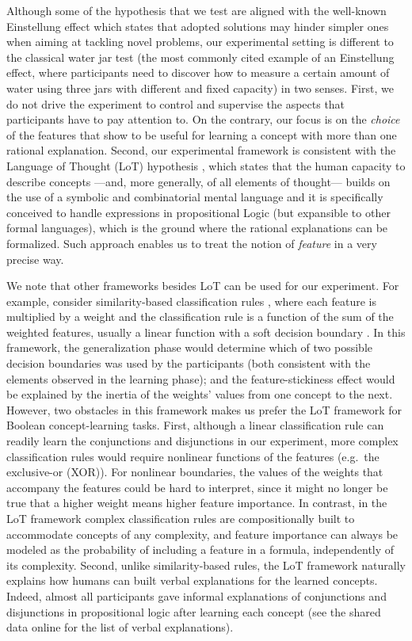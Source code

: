 Although some of the hypothesis that we test are aligned with the well-known Einstellung effect which states that adopted solutions may hinder simpler ones when aiming at tackling novel problems, our experimental setting is different to the classical water jar test (the most commonly cited example of an Einstellung effect, where participants need to discover how to measure a certain amount of water using three jars with different and fixed capacity)  \cite{luchins1942mechanization}
in two senses. First, we do not drive the experiment to control and supervise the aspects that participants have to pay attention to. On the contrary, our focus is on the {\em choice} of the features that show to be useful for learning a concept with more than one rational explanation. Second, our experimental framework is consistent with the Language of Thought (LoT) hypothesis \cite{fodor1975language}, which states that the human capacity to describe concepts —and, more generally, of all elements of thought— builds on the use of a symbolic and combinatorial mental language
and it is specifically conceived to handle expressions in propositional Logic (but expansible to other formal languages), which is the ground where the rational explanations can be formalized. Such approach enables us to treat the notion of {\em feature} in a very precise way. 

We note that other frameworks besides LoT can be used for our experiment. For example, consider similarity-based classification rules \cite{juslin2003cue,juslin2003exemplar}, where each feature is multiplied by a weight and the classification rule is a function of the sum of the weighted features, usually a linear function with a soft decision boundary \cite{juslin2003exemplar}. In this framework, the generalization phase would determine which of two possible decision boundaries was used by the participants (both consistent with the elements observed in the learning phase); and the feature-stickiness effect would be explained by the inertia of the weights' values from one concept to the next. However, two obstacles in this framework makes us prefer the LoT framework for Boolean concept-learning tasks. First, although a linear classification rule can readily learn the conjunctions and disjunctions in our experiment, more complex classification rules would require nonlinear functions of the features (e.g.\ the exclusive-or (XOR)). For nonlinear boundaries, the values of the weights that accompany the features could be hard to interpret, since it might no longer be true that a higher weight means higher feature importance. In contrast, in the LoT framework complex classification rules are compositionally built to accommodate concepts of any complexity, and feature importance can always be modeled as the probability of including a feature in a formula, independently of its complexity. Second, unlike similarity-based rules, the LoT framework naturally explains how humans can built verbal explanations for the learned concepts. Indeed, almost all participants gave informal explanations of conjunctions and disjunctions in propositional logic after learning each concept (see the shared data online for the list of verbal explanations). 



